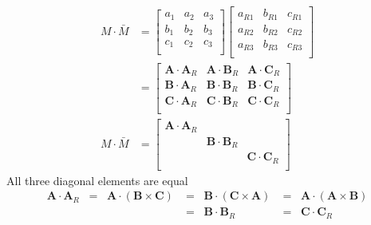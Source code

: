 \documentclass[../../../main.tex]{subfiles}
\begin{document}
\begin{align*}
	M \cdot \bar{M } & =
	\begin{bmatrix}
		a_1 & a_2 & a_3 \\
		b_1 & b_2 & b_3 \\
		c_1 & c_2 & c_3 \\
	\end{bmatrix}
	\begin{bmatrix}
		a_{R1} & b_{R1} & c_{R1} \\
		a_{R2} & b_{R2} & c_{R2} \\
		a_{R3} & b_{R3} & c_{R3} \\
	\end{bmatrix}
	\\
	                 & =
	\begin{bmatrix}
		\mathbf{A }\cdot \mathbf{A }_R & \mathbf{A }\cdot \mathbf{B}_R & \mathbf{A }\cdot \mathbf{C }_R \\
		\mathbf{B }\cdot \mathbf{A }_R & \mathbf{B }\cdot \mathbf{B}_R & \mathbf{B }\cdot \mathbf{C }_R \\
		\mathbf{C }\cdot \mathbf{A }_R & \mathbf{C }\cdot \mathbf{B}_R & \mathbf{C }\cdot \mathbf{C }_R \\
	\end{bmatrix}
	\\
	M \cdot \bar{M}  & =
	\begin{bmatrix}
		\mathbf{A }\cdot \mathbf{A }_R &                               &                                \\
		                               & \mathbf{B }\cdot \mathbf{B}_R &                                \\
		                               &                               & \mathbf{C }\cdot \mathbf{C }_R \\
	\end{bmatrix}
\end{align*}
All three diagonal elements are equal
\begin{equation*}
	\begin{array}{rll}
		\mathbf{A } \cdot \mathbf{A }_R\;\;=\;\;\mathbf{A }\cdot \left( \mathbf{B }\times \mathbf{C } \right) & =\;\;\mathbf{B }\cdot \left( \mathbf{C }\times \mathbf{A } \right) & =\;\;\mathbf{A }\cdot \left( \mathbf{A }\times \mathbf{B } \right) \\
		                                                                                                      & =\;\;\mathbf{B }\cdot \mathbf{B }_R                                & =\;\;\mathbf{C }\cdot \mathbf{C }_R                                \\
	\end{array}
\end{equation*}
\end{document}
